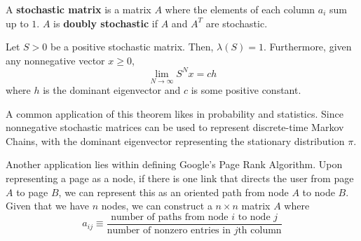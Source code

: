   \begin{definition}
  A \textbf{stochastic matrix} is a matrix $A$ where the elements of each column $a_i$ sum up to $1$. $A$ is \textbf{doubly stochastic} if $A$ and $A^T$ are stochastic. 
  \end{definition}

  \begin{theorem}
  Let $S > 0$ be a positive stochastic matrix. Then, $\lambda(S) = 1$. Furthermore, given any nonnegative vector $x \geq 0$, 
  \[\lim_{N \rightarrow \infty} S^N x = c h\]
  where $h$ is the dominant eigenvector and $c$ is some positive constant. 
  \end{theorem}

  A common application of this theorem likes in probability and statistics. Since nonnegative stochastic matrices can be used to represent discrete-time Markov Chains, with the dominant eigenvector representing the stationary distribution $\pi$. 

  Another application lies within defining Google's Page Rank Algorithm. Upon representing a page as a node, if there is one link that directs the user from page $A$ to page $B$, we can represent this as an oriented path from node $A$ to node $B$. Given that we have $n$ nodes, we can construct a $n \times n$ matrix $A$ where 
  \[a_{i j} \equiv  \frac{\text{number of paths from node $i$ to node $j$}}{\text{number of nonzero entries in $j$th column}}\]

